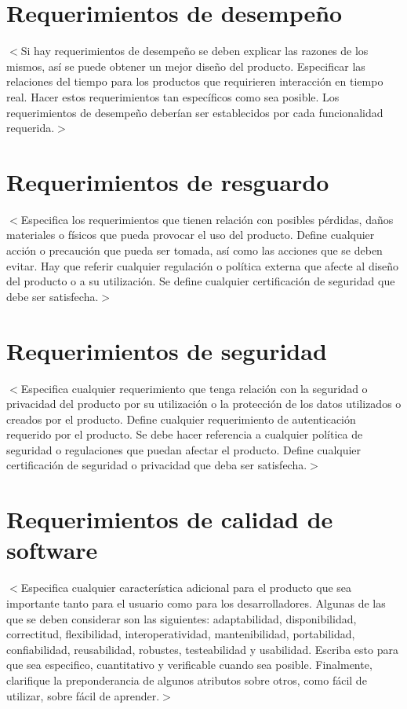 \documentclass{scrreprt}
\begin{document}
\section{Requerimientos de desempeño}
$<$Si hay requerimientos de desempeño se deben explicar las razones de los mismos,
así se puede obtener un mejor diseño del producto. Especificar las relaciones del 
tiempo para los productos que requirieren interacción en tiempo real. Hacer estos
requerimientos tan específicos como sea posible. Los requerimientos de desempeño
deberían ser establecidos por cada funcionalidad requerida.$>$

\section{Requerimientos de resguardo}
$<$Especifica los requerimientos que tienen relación con posibles pérdidas, daños
materiales o físicos que pueda provocar el uso del producto. Define cualquier acción
o precaución que pueda ser tomada, así como las acciones que se deben evitar.
Hay que referir cualquier regulación o política externa que afecte al diseño del
producto o a su utilización. Se define cualquier certificación de seguridad que
debe ser satisfecha.$>$

\section{Requerimientos de seguridad}
$<$Especifica cualquier requerimiento que tenga relación con la seguridad o privacidad
del producto por su utilización o la protección de los datos utilizados o creados
por el producto. Define cualquier requerimiento de autenticación requerido por el
producto. Se debe hacer referencia a cualquier política de seguridad o regulaciones
que puedan afectar el producto. Define cualquier certificación de seguridad o
privacidad que deba ser satisfecha.$>$

\section{Requerimientos de calidad de software}
$<$Especifica cualquier característica adicional para el producto que sea importante
tanto para el usuario como para los desarrolladores. Algunas de las que se deben 
considerar son las siguientes: adaptabilidad, disponibilidad, correctitud, 
flexibilidad, interoperatividad, mantenibilidad, portabilidad, confiabilidad, 
reusabilidad, robustes, testeabilidad y usabilidad. Escriba esto para que sea especifico, 
cuantitativo y verificable cuando sea posible. Finalmente, clarifique la preponderancia
de algunos atributos sobre otros, como fácil de utilizar, sobre fácil de aprender.$>$
\end{document}
